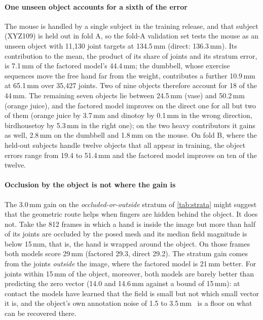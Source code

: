 \paragraph{One unseen object accounts for a sixth of the error}
The mouse is handled by a single subject in the training release, and that subject (XYZ109) is held out in fold A, so the fold-A validation set tests the mouse as an unseen object with 11,130 joint targets at 134.5\,mm (direct: 136.3\,mm). Its contribution to the mean, the product of its share of joints and its stratum error, is 7.1\,mm of the factored model's 44.4\,mm; the dumbbell, whose exercise sequences move the free hand far from the weight, contributes a further 10.9\,mm at 65.1\,mm over 35,427 joints. Two of nine objects therefore account for 18 of the 44\,mm. The remaining seven objects lie between 24.5\,mm (vase) and 50.2\,mm (orange juice), and the factored model improves on the direct one for all but two of them (orange juice by 3.7\,mm and dinotoy by 0.1\,mm in the wrong direction, birdhousetoy by 5.3\,mm in the right one); on the two heavy contributors it gains as well, 2.8\,mm on the dumbbell and 1.8\,mm on the mouse. On fold B, where the held-out subjects handle twelve objects that all appear in training, the object errors range from 19.4 to 51.4\,mm and the factored model improves on ten of the twelve.

\paragraph{Occlusion by the object is not where the gain is}
The 3.0\,mm gain on the \emph{occluded-or-outside} stratum of \cref{tab:strata} might suggest that the geometric route helps when fingers are hidden behind the object. It does not. Take the 812 frames in which a hand is inside the image but more than half of its joints are occluded by the posed mesh and its median field magnitude is below 15\,mm, that is, the hand is wrapped around the object. On those frames both models score 29\,mm (factored 29.3, direct 29.2). The stratum gain comes from the joints \emph{outside} the image, where the factored model is 21\,mm better. For joints within 15\,mm of the object, moreover, both models are barely better than predicting the zero vector (14.0 and 14.6\,mm against a bound of 15\,mm): at contact the models have learned that the field is small but not which small vector it is, and the object's own annotation noise of 1.5 to 3.5\,mm~\cite{rim2026show3d} is a floor on what can be recovered there.

